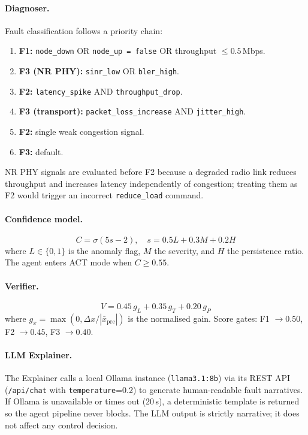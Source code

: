 \documentclass[12pt,a4paper]{article}
\begin{document}
\paragraph{Diagnoser.}
Fault classification follows a priority chain:
\begin{enumerate}[noitemsep]
  \item \textbf{F1:} \texttt{node\_down} OR \texttt{node\_up = false} OR throughput $\leq 0.5$\,Mbps.
  \item \textbf{F3 (NR PHY):} \texttt{sinr\_low} OR \texttt{bler\_high}.
  \item \textbf{F2:} \texttt{latency\_spike} AND \texttt{throughput\_drop}.
  \item \textbf{F3 (transport):} \texttt{packet\_loss\_increase} AND \texttt{jitter\_high}.
  \item \textbf{F2:} single weak congestion signal.
  \item \textbf{F3:} default.
\end{enumerate}
NR PHY signals are evaluated before F2 because a degraded radio link
reduces throughput and increases latency independently of congestion; treating
them as F2 would trigger an incorrect \texttt{reduce\_load} command.

\paragraph{Confidence model.}
\begin{equation}
  C = \sigma\!\left(5s - 2\right), \quad s = 0.5L + 0.3M + 0.2H
  \label{eq:conf}
\end{equation}
where $L \in \{0,1\}$ is the anomaly flag, $M$ the severity, and $H$ the
persistence ratio. The agent enters ACT mode when $C \geq 0.55$.

\paragraph{Verifier.}
\begin{equation}
  V = 0.45\,g_L + 0.35\,g_T + 0.20\,g_P
  \label{eq:verif}
\end{equation}
where $g_x = \max(0, \Delta x / |\bar{x}_\text{pre}|)$ is the normalised gain.
Score gates: F1 $\to 0.50$, F2 $\to 0.45$, F3 $\to 0.40$.

\paragraph{LLM Explainer.}
The Explainer calls a local Ollama instance (\texttt{llama3.1:8b}) via its
REST API (\texttt{/api/chat} with \texttt{temperature}=0.2) to generate
human-readable fault narratives. If Ollama is unavailable or times out
(20\,s), a deterministic template is returned so the agent pipeline never
blocks. The LLM output is strictly narrative; it does not affect any control
decision.
\end{document}
